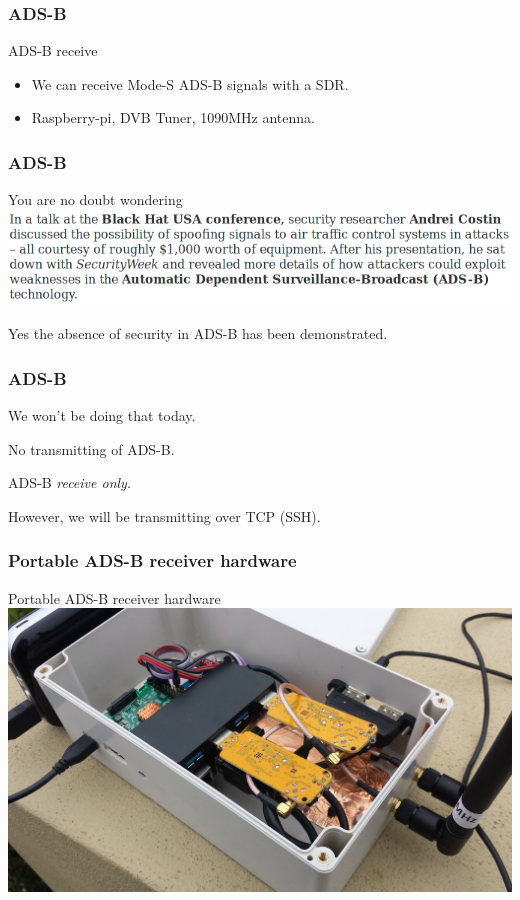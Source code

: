 \begin{frame}
\frametitle{ADS-B}
\begin{block}{ADS-B receive}
\begin{itemize}
\item<1-> We can receive Mode-S ADS-B signals with a SDR.
\item<2-> Raspberry-pi, DVB Tuner, 1090MHz antenna.
\end{itemize}
\end{block}
\end{frame}

\begin{frame}
\frametitle{ADS-B}
\begin{block}{You are no doubt wondering}
\includegraphics[height=0.18\textheight]{image/adsb-security.png}
\end{block}
Yes the absence of security in ADS-B has been demonstrated.
\end{frame}

\begin{frame}
\frametitle{ADS-B}
\begin{center}
We won't be doing that today.
\par
No transmitting of ADS-B.
\par
ADS-B \emph{receive only}.
\par
However, we will be transmitting over TCP (SSH).
\end{center}
\end{frame}

\begin{frame}
\frametitle{Portable ADS-B receiver hardware}
\begin{block}{Portable ADS-B receiver hardware}
\includegraphics[height=0.5\textheight]{image/adsb-hardware.png}
\end{block}
\end{frame}

